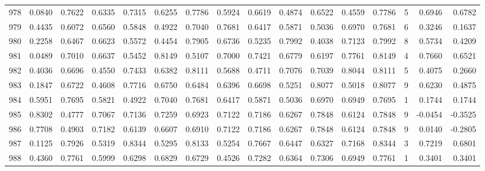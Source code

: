 \begin{tabular}{lrrrrrrrrrrrrrrr}
978 &      0.0840 &  0.7622 &  0.6335 &  0.7315 &  0.6255 &  0.7786 &  0.5924 &  0.6619 &  0.4874 &  0.6522 &   0.4559 &     0.7786 &      5 &                    0.6946 &                     0.6782 \\
979 &      0.4435 &  0.6072 &  0.6560 &  0.5848 &  0.4922 &  0.7040 &  0.7681 &  0.6417 &  0.5871 &  0.5036 &   0.6970 &     0.7681 &      6 &                    0.3246 &                     0.1637 \\
980 &      0.2258 &  0.6467 &  0.6623 &  0.5572 &  0.4454 &  0.7905 &  0.6736 &  0.5235 &  0.7992 &  0.4038 &   0.7123 &     0.7992 &      8 &                    0.5734 &                     0.4209 \\
981 &      0.0489 &  0.7010 &  0.6637 &  0.5452 &  0.8149 &  0.5107 &  0.7000 &  0.7421 &  0.6779 &  0.6197 &   0.7761 &     0.8149 &      4 &                    0.7660 &                     0.6521 \\
982 &      0.4036 &  0.6696 &  0.4550 &  0.7433 &  0.6382 &  0.8111 &  0.5688 &  0.4711 &  0.7076 &  0.7039 &   0.8044 &     0.8111 &      5 &                    0.4075 &                     0.2660 \\
983 &      0.1847 &  0.6722 &  0.4608 &  0.7716 &  0.6750 &  0.6484 &  0.6396 &  0.6698 &  0.5251 &  0.8077 &   0.5018 &     0.8077 &      9 &                    0.6230 &                     0.4875 \\
984 &      0.5951 &  0.7695 &  0.5821 &  0.4922 &  0.7040 &  0.7681 &  0.6417 &  0.5871 &  0.5036 &  0.6970 &   0.6949 &     0.7695 &      1 &                    0.1744 &                     0.1744 \\
985 &      0.8302 &  0.4777 &  0.7067 &  0.7136 &  0.7259 &  0.6923 &  0.7122 &  0.7186 &  0.6267 &  0.7848 &   0.6124 &     0.7848 &      9 &                   -0.0454 &                    -0.3525 \\
986 &      0.7708 &  0.4903 &  0.7182 &  0.6139 &  0.6607 &  0.6910 &  0.7122 &  0.7186 &  0.6267 &  0.7848 &   0.6124 &     0.7848 &      9 &                    0.0140 &                    -0.2805 \\
987 &      0.1125 &  0.7926 &  0.5319 &  0.8344 &  0.5295 &  0.8133 &  0.5254 &  0.7667 &  0.6447 &  0.6327 &   0.7168 &     0.8344 &      3 &                    0.7219 &                     0.6801 \\
988 &      0.4360 &  0.7761 &  0.5999 &  0.6298 &  0.6829 &  0.6729 &  0.4526 &  0.7282 &  0.6364 &  0.7306 &   0.6949 &     0.7761 &      1 &                    0.3401 &                     0.3401 \\

\end{tabular}
